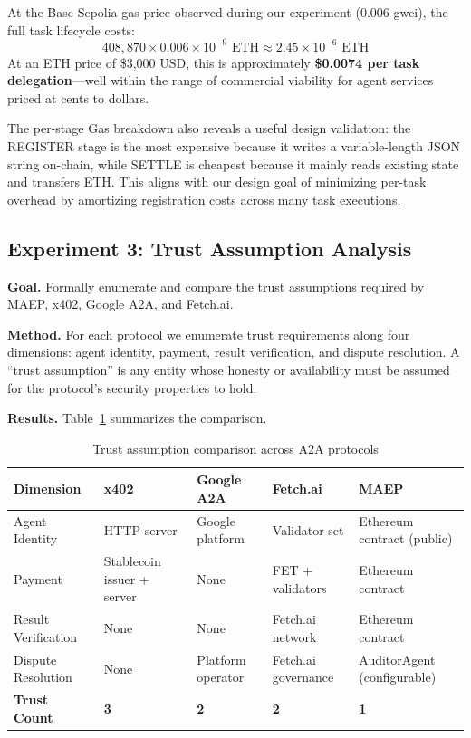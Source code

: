 \documentclass[conference]{IEEEtran}
\begin{document}
At the Base Sepolia gas price observed during our experiment
(0.006 gwei), the full task lifecycle costs:
\[408{,}870 \times 0.006 \times 10^{-9} \text{ ETH} \approx 2.45 \times 10^{-6} \text{ ETH}\]
At an ETH price of \$3{,}000 USD, this is approximately \textbf{\$0.0074
per task delegation}---well within the range of commercial viability
for agent services priced at cents to dollars.

The per-stage Gas breakdown also reveals a useful design validation:
the REGISTER stage is the most expensive because it writes a variable-length
JSON string on-chain, while SETTLE is cheapest because it mainly
reads existing state and transfers ETH.  This aligns with our design
goal of minimizing per-task overhead by amortizing registration costs
across many task executions.

\subsection{Experiment 3: Trust Assumption Analysis}

\textbf{Goal.}
Formally enumerate and compare the trust assumptions required by MAEP,
x402, Google A2A, and Fetch.ai.

\textbf{Method.}
For each protocol we enumerate trust requirements along four
dimensions: agent identity, payment, result verification, and dispute
resolution.  A ``trust assumption'' is any entity whose honesty or
availability must be assumed for the protocol's security properties to
hold.

\textbf{Results.}
Table~\ref{tab:trust} summarizes the comparison.

\begin{table}[h]
\caption{Trust assumption comparison across A2A protocols}
\label{tab:trust}
\centering
\renewcommand{\arraystretch}{1.15}
\begin{tabular}{p{1.5cm}p{1.5cm}p{1.5cm}p{1.5cm}p{1.5cm}}
\toprule
\textbf{Dimension} & \textbf{x402} & \textbf{Google A2A} & \textbf{Fetch.ai} & \textbf{MAEP} \\
\midrule
Agent Identity
  & HTTP server
  & Google platform
  & Validator set
  & Ethereum contract (public) \\
\addlinespace
Payment
  & Stablecoin issuer + server
  & None
  & FET + validators
  & Ethereum contract \\
\addlinespace
Result Verification
  & None
  & None
  & Fetch.ai network
  & Ethereum contract \\
\addlinespace
Dispute Resolution
  & None
  & Platform operator
  & Fetch.ai governance
  & AuditorAgent (configurable) \\
\midrule
\textbf{Trust Count} & \textbf{3} & \textbf{2} & \textbf{2} & \textbf{1} \\
\bottomrule
\end{tabular}
\end{table}
\end{document}
